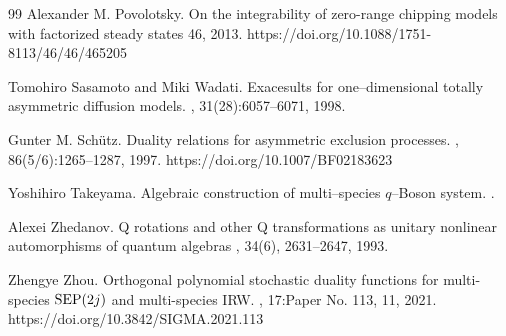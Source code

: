 \documentclass{ximera}
\begin{document}
\begin{thebibliography}{99}
Alexander M. Povolotsky.
\newblock On the integrability of zero-range chipping models with factorized steady states
 46, 2013.
https://doi.org/10.1088/1751-8113/46/46/465205


Tomohiro Sasamoto and Miki Wadati.
\newblock Exacesults for one--dimensional totally asymmetric diffusion
  models.
, 31(28):6057--6071, 1998.


Gunter M. Sch{\"u}tz.
\newblock Duality relations for asymmetric exclusion processes.
, 86(5/6):1265--1287, 1997.
https://doi.org/10.1007/BF02183623

Yoshihiro Takeyama.
\newblock Algebraic construction of multi--species $q$--{B}oson system.
.


Alexei Zhedanov.
\newblock Q rotations and other Q transformations as unitary nonlinear automorphisms of quantum algebras
, 34(6), 2631--2647, 1993.


Zhengye Zhou. 
\newblock Orthogonal polynomial stochastic duality functions for multi-species
  {${\rm SEP}(2j)$} and multi-species {IRW}.
, 17:Paper No.
  113, 11, 2021.
 https://doi.org/10.3842/SIGMA.2021.113

\end{thebibliography}
\end{document}
